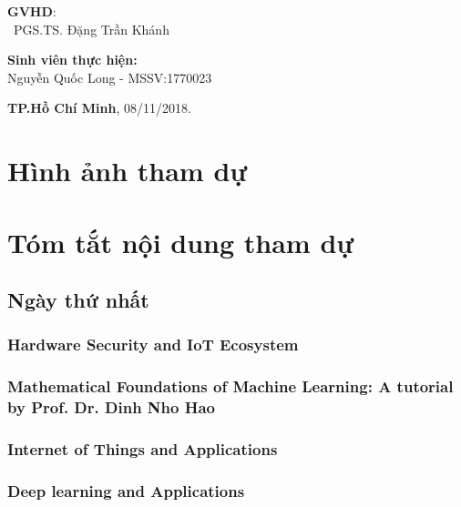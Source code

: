 \documentclass{hcmutarticle}
\begin{document}
\vspace{2cm}

\begin{minipage}[t]{0.60\linewidth}
\textbf{GVHD}: \\
\ PGS.TS. Đặng Trần Khánh
\end{minipage}
\begin{minipage}[t]{0.40\linewidth}
\textbf{Sinh viên thực hiện:}\\
Nguyễn Quốc Long - MSSV:1770023
\end{minipage}

\vspace{4cm}

\begin{center}

\textbf{TP.Hồ Chí Minh},
08/11/2018.

\end{center}



\newpage

\tableofcontents 

\newpage

\section{Hình ảnh tham dự}


\section{Tóm tắt nội dung tham dự}\label{survey}
\subsection{Ngày thứ nhất}
\subsubsection{Hardware Security and IoT Ecosystem}
\subsubsection{Mathematical Foundations of Machine Learning: A tutorial by Prof. Dr. Dinh Nho Hao}
\subsubsection{Internet of Things and Applications}
\subsubsection{Deep learning and Applications}
\end{document}
